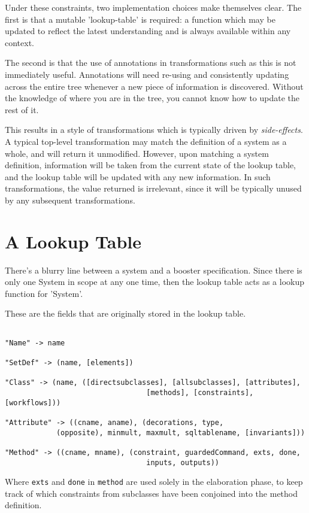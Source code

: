 Under these constraints, two implementation choices make themselves
clear.  The first is that a mutable 'lookup-table' is required: a
function which may be updated to reflect the latest understanding and
is always available within any context.

The second is that the use of annotations in transformations such as
this is not immediately useful.  Annotations will need re-using and
consistently updating across the entire tree whenever a new piece of
information is discovered.  Without the knowledge of where you are in
the tree, you cannot know how to update the rest of it.  

This results in a style of transformations which is typically driven
by \emph{side-effects}.  A typical top-level transformation may match
the definition of a system as a whole, and will return it unmodified.
However, upon matching a system definition, information will be taken
from the current state of the lookup table, and the lookup table will
be updated with any new information.  In such transformations, the
value returned is irrelevant, since it will be typically unused by any
subsequent transformations.




\section{A Lookup Table}

There's a blurry line between a system and a booster specification.
Since there is only one System in scope at any one time, then the
lookup table acts as a lookup function for 'System'.

These are the fields that are originally stored in the lookup table.

\begin{verbatim}

"Name" -> name

"SetDef" -> (name, [elements])

"Class" -> (name, ([directsubclasses], [allsubclasses], [attributes],  
                                 [methods], [constraints], [workflows]))

"Attribute" -> ((cname, aname), (decorations, type, 
            (opposite), minmult, maxmult, sqltablename, [invariants])) 

"Method" -> ((cname, mname), (constraint, guardedCommand, exts, done, 
                                 inputs, outputs))

\end{verbatim}

Where \verb|exts| and \verb|done| in \verb|method| are used solely in the elaboration
phase, to keep track of which constraints from subclasses have been
conjoined into the method definition.
